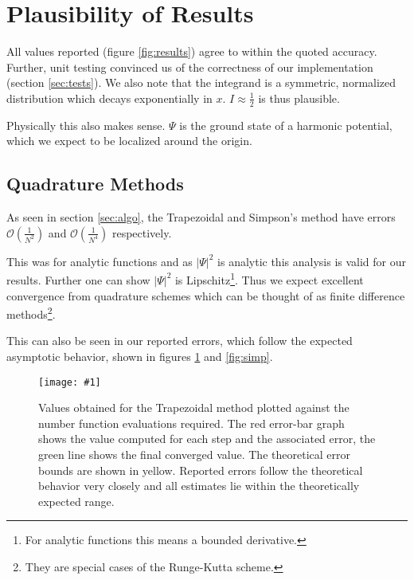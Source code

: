 \documentclass[10pt, a4paper]{article}
\newcommand{\plot}[3]{\begin{figure}[htp]\centering\texttt{[image: \#1]}\caption{#2}\label{#3}\end{figure}}
\begin{document}
\section{Plausibility of Results}
\label{sec:verify}


  All values reported (figure \ref{fig:results}) agree to within the quoted accuracy. Further, unit
  testing convinced us of the correctness of our implementation (section \ref{sec:tests}). We also note
  that the integrand is a symmetric, normalized distribution which decays exponentially in $x$.
  $I \approx \frac12$ is thus plausible.

  Physically this also makes sense. $\Psi$ is the ground state of a harmonic potential, which we expect
  to be localized around the origin.

  \subsection{Quadrature Methods}
  As seen in section \ref{sec:algo}, the Trapezoidal and Simpson's method have errors
  $\mathcal{O}\left( \frac{1}{N^2} \right)$ and $\mathcal{O}\left( \frac{1}{N^4} \right)$ respectively.

  This was for analytic functions and as $|\Psi|^2$ is analytic this analysis is valid
  for our results. Further one can show $|\Psi|^2$ is Lipschitz\footnote{For analytic functions this means
  a bounded derivative.}. Thus we expect excellent convergence
  from quadrature schemes which can be thought of as finite difference methods\footnote{They are special
  cases of the Runge-Kutta scheme\cite{nr}.}.

  This can also be seen in our reported errors, which follow the expected asymptotic behavior, shown in
  figures \ref{fig:trap} and \ref{fig:simp}.

  \plot{proj-trap-accuracy}{
    Values obtained for the Trapezoidal method plotted against the number function evaluations required. The red
    error-bar graph shows the value computed for each step and the associated error, the green line
    shows the final converged value. The theoretical error bounds are shown in yellow. Reported errors
    follow the theoretical behavior very closely and all estimates lie within the theoretically expected range.
  }{fig:trap}
\end{document}
